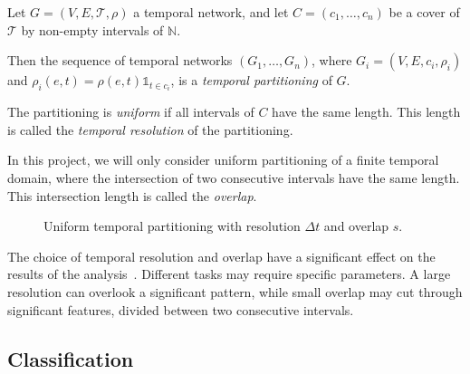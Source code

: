 \documentclass[a4paper,11pt,openany,extrafontsizes]{memoir}
\begin{document}
\begin{defn}\label{defn:partitioning}
  Let $G = (V, E, \mathcal{T}, \rho)$ a temporal network, and let
  $C = (c_1,\ldots,c_n)$ be a cover of $\mathcal{T}$ by non-empty
  intervals of $\mathbb{N}$.

  Then the sequence of temporal networks $(G_1,\ldots,G_n)$, where
  $G_i = (V, E, c_i, \rho_i)$ and
  $\rho_i(e, t) = \rho(e, t)\mathbb{1}_{t\in c_i}$, is a
  \emph{temporal partitioning} of $G$.

  The partitioning is \emph{uniform} if all intervals of $C$ have the
  same length. This length is called the \emph{temporal resolution} of
  the partitioning.
\end{defn}

In this project, we will only consider uniform partitioning of a
finite temporal domain, where the intersection of two consecutive
intervals have the same length. This intersection length is called the
\emph{overlap}.

\begin{figure}[!ht]
  \centering
  \caption{Uniform temporal partitioning with resolution $\Delta t$ and overlap $s$.}%
  \label{fig:partitioning}
\end{figure}

The choice of temporal resolution and overlap have a significant
effect on the results of the analysis~\cite{ribeiro_quantifying_2013,
  krings_effects_2012, sulo_meaningful_2010}. Different tasks may
require specific parameters. A large resolution can overlook a
significant pattern, while small overlap may cut through significant
features, divided between two consecutive intervals.

\subsection{Classification}%
\label{sec:classification}
\end{document}

